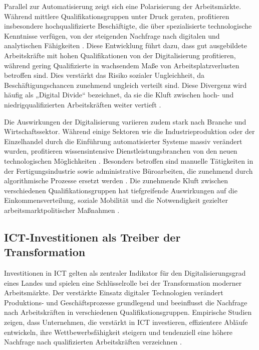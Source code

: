 Parallel zur Automatisierung zeigt sich eine Polarisierung der Arbeitsmärkte. Während 
mittlere Qualifikationsgruppen unter Druck geraten, profitieren insbesondere 
hochqualifizierte Beschäftigte, die über spezialisierte technologische Kenntnisse 
verfügen, von der steigenden Nachfrage nach digitalen und analytischen Fähigkeiten 
\parencite[vgl.][S. 2509]{goos2014explaining}. Diese Entwicklung führt dazu, dass gut 
ausgebildete Arbeitskräfte mit hohen Qualifikationen von der Digitalisierung profitieren, 
während gering Qualifizierte in wachsendem Maße von Arbeitsplatzverlusten betroffen sind. 
Dies verstärkt das Risiko sozialer Ungleichheit, da Beschäftigungschancen zunehmend 
ungleich verteilt sind. Diese Divergenz wird häufig als „Digital Divide“ bezeichnet, da 
sie die Kluft zwischen hoch- und niedrigqualifizierten Arbeitskräften weiter vertieft 
\parencite[vgl.][S. 3]{oecd2019measuring}.

Die Auswirkungen der Digitalisierung variieren zudem stark nach Branche und
Wirtschaftssektor. Während einige Sektoren wie die Industrieproduktion oder der
Einzelhandel durch die Einführung automatisierter Systeme massiv verändert wurden,
profitieren wissensintensive Dienstleistungsbranchen von den neuen technologischen 
Möglichkeiten \parencite[vgl.][S. 1555]{autor2013thegrowth}. Besonders betroffen sind 
manuelle Tätigkeiten in der Fertigungsindustrie sowie administrative Büroarbeiten, die 
zunehmend durch algorithmische Prozesse ersetzt werden 
\parencite[vgl.][S. 36-38]{frey2013thefuture}. Die zunehmende Kluft zwischen verschiedenen 
Qualifikationsgruppen hat tiefgreifende Auswirkungen auf die Einkommensverteilung, soziale 
Mobilität und die Notwendigkeit gezielter arbeitsmarktpolitischer Maßnahmen 
\parencite[S. 1589-1591]{autor2013thegrowth}.


\subsection{ICT-Investitionen als Treiber der Transformation}

Investitionen in \ac{ICT} gelten als zentraler Indikator für den Digitalisierungsgrad eines 
Landes und spielen eine Schlüsselrolle bei der Transformation moderner Arbeitsmärkte. Der 
verstärkte Einsatz digitaler Technologien verändert Produktions- und Geschäftsprozesse 
grundlegend und beeinflusst die Nachfrage nach Arbeitskräften in verschiedenen 
Qualifikationsgruppen. Empirische Studien zeigen, dass Unternehmen, die verstärkt in 
\ac{ICT} investieren, effizientere Abläufe entwickeln, ihre Wettbewerbsfähigkeit steigern 
und tendenziell eine höhere Nachfrage nach qualifizierten Arbeitskräften verzeichnen 
\parencite[vgl.][S. 30-31]{corrado2018intangible}.

